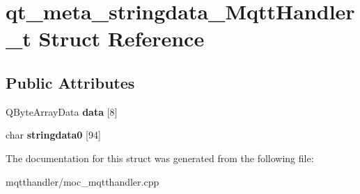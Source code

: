 \hypertarget{structqt__meta__stringdata__MqttHandler__t}{}\section{qt\+\_\+meta\+\_\+stringdata\+\_\+\+Mqtt\+Handler\+\_\+t Struct Reference}
\label{structqt__meta__stringdata__MqttHandler__t}
\subsection*{Public Attributes}
\begin{DoxyCompactItemize}
\item 
\mbox{\label{structqt__meta__stringdata__MqttHandler__t_afb7f5b140bda17908af37b8dd9f05f68}} 
Q\+Byte\+Array\+Data {\bfseries data} \mbox{[}8\mbox{]}
\item 
\mbox{\label{structqt__meta__stringdata__MqttHandler__t_af32243d4be53e7ce745e6b8c7b3d7bf6}} 
char {\bfseries stringdata0} \mbox{[}94\mbox{]}
\end{DoxyCompactItemize}


The documentation for this struct was generated from the following file\+:\begin{DoxyCompactItemize}
\item 
mqtthandler/moc\+\_\+mqtthandler.\+cpp\end{DoxyCompactItemize}
